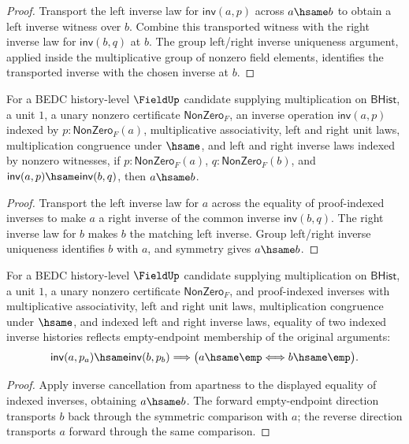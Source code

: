 \begin{proof}
Transport the left inverse law for $\mathsf{inv}(a,p)$ across $a\hsame b$ to obtain a left inverse witness over $b$. Combine this transported witness with the right inverse law for $\mathsf{inv}(b,q)$ at $b$. The group left/right inverse uniqueness argument, applied inside the multiplicative group of nonzero field elements, identifies the transported inverse with the chosen inverse at $b$.
\end{proof}

\begin{theorem}
\label{thm:field-inverse-cancel-from-apartness}
For a BEDC history-level $\FieldUp$ candidate supplying multiplication on
$\mathsf{BHist}$, a unit $1$, a unary nonzero certificate
$\mathsf{NonZero}_F$, an inverse operation $\mathsf{inv}(a,p)$ indexed by
$p:\mathsf{NonZero}_F(a)$, multiplicative associativity, left and right unit
laws, multiplication congruence under $\hsame$, and left and right inverse
laws indexed by nonzero witnesses, if $p:\mathsf{NonZero}_F(a)$,
$q:\mathsf{NonZero}_F(b)$, and
$\mathsf{inv}(a,p)\hsame\mathsf{inv}(b,q)$, then $a\hsame b$.
\end{theorem}
\begin{proof}
Transport the left inverse law for $a$ across the equality of
proof-indexed inverses to make $a$ a right inverse of the common inverse
$\mathsf{inv}(b,q)$. The right inverse law for $b$ makes $b$ the
matching left inverse. Group left/right inverse uniqueness identifies $b$
with $a$, and symmetry gives $a\hsame b$.
\end{proof}

\begin{theorem}
\label{thm:field-inverse-empty-endpoint-reflection-from-apartness}
For a BEDC history-level $\FieldUp$ candidate supplying multiplication on
$\mathsf{BHist}$, a unit $1$, a unary nonzero certificate
$\mathsf{NonZero}_F$, and proof-indexed inverses with multiplicative
associativity, left and right unit laws, multiplication congruence under
$\hsame$, and indexed left and right inverse laws, equality of two indexed
inverse histories reflects empty-endpoint membership of the original
arguments:
$$
\mathsf{inv}(a,p_a)\hsame\mathsf{inv}(b,p_b)
\Longrightarrow
\bigl(a\hsame\emp \Longleftrightarrow b\hsame\emp\bigr).
$$
\end{theorem}
\begin{proof}
Apply inverse cancellation from apartness to the displayed equality of indexed
inverses, obtaining $a\hsame b$. The forward empty-endpoint direction
transports $b$ back through the symmetric comparison with $a$; the reverse
direction transports $a$ forward through the same comparison.
\end{proof}

